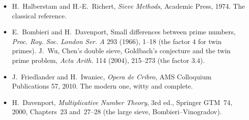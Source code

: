 \begin{itemize}
\item H.~Halberstam and H.-E.~Richert, \emph{Sieve Methods}, Academic Press, 1974. The classical reference.
\item E.~Bombieri and H.~Davenport, Small differences between prime numbers, \emph{Proc. Roy. Soc. London Ser. A} 293 (1966), 1--18 (the factor $4$ for twin primes). J.~Wu, Chen's double sieve, Goldbach's conjecture and the twin prime problem, \emph{Acta Arith.} 114 (2004), 215--273 (the factor $3.4$).
\item J.~Friedlander and H.~Iwaniec, \emph{Opera de Cribro}, AMS Colloquium Publications 57, 2010. The modern one, witty and complete.
\item H.~Davenport, \emph{Multiplicative Number Theory}, 3rd ed., Springer GTM~74, 2000, Chapters~23 and~27--28 (the large sieve, Bombieri--Vinogradov).
\end{itemize}

